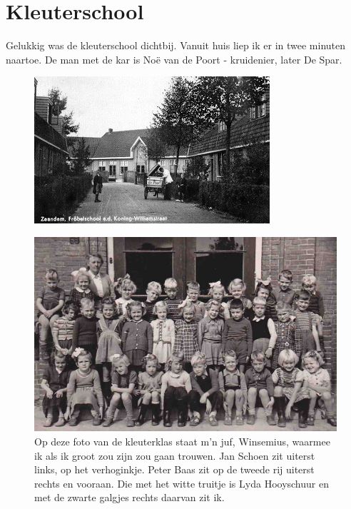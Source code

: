 \documentclass[12pt,twoside, openright]{memoir}
\begin{document}
\chapter{Kleuterschool} %
\label{cha:kleuterschool}

Gelukkig was de kleuterschool dichtbij. Vanuit huis liep ik er in twee minuten naartoe. De man met de kar is Noë van de Poort - kruidenier, later De Spar.

\begin{figure}
\includegraphics[width=\textwidth]{img/ch6/Frobelschool}
\caption*{\footnotesize }
\end{figure}



\begin{figure}
\includegraphics[width=\textwidth]{img/ch6/klschool53}
\caption*{\footnotesize Op deze foto van de kleuterklas staat m’n juf, Winsemius, waarmee ik als ik groot zou zijn zou gaan trouwen. Jan Schoen zit uiterst links, op het verhoginkje. Peter Baas zit op de tweede rij uiterst rechts en vooraan. Die met het witte truitje is Lyda Hooyschuur en met de zwarte galgjes rechts daarvan zit ik. }
\end{figure}
\end{document}
